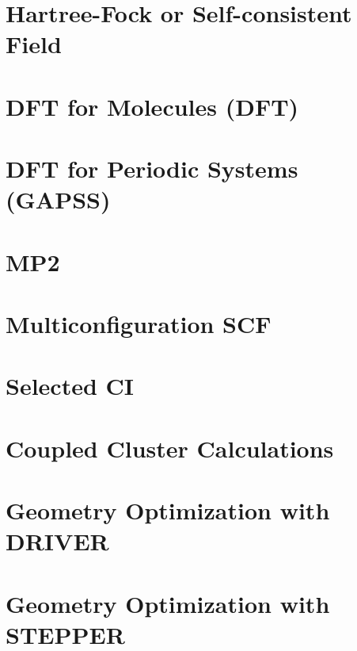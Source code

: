 \documentclass[12pt,fleqn]{book}
\begin{document}
\chapter{Hartree-Fock or Self-consistent Field} 


\chapter{DFT for Molecules (DFT)}


\chapter{DFT for Periodic Systems (GAPSS)}


\chapter{MP2}


\chapter{Multiconfiguration SCF}


\chapter{Selected CI}


\chapter{Coupled Cluster Calculations}


%


\chapter{Geometry Optimization with DRIVER}


\chapter{Geometry Optimization with STEPPER}

\end{document}
